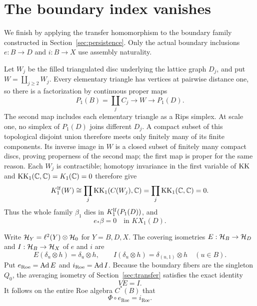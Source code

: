 \section{The boundary index vanishes}\label{sec:vanishing}

We finish by applying the transfer homomorphism to the boundary family
constructed in Section~\ref{sec:persistence}. Only the actual boundary
inclusions $e:B\to D$ and $i:B\to X$ use assembly naturality.

Let $W_j$ be the filled triangulated disc underlying the lattice graph $D_j$,
and put $W=\coprod_{j\ge2}W_j$. Every elementary triangle has vertices at
pairwise distance one, so there is a factorization by continuous proper maps
\[
 P_1(B)=\coprod_j C_j\longrightarrow W\longrightarrow P_1(D).
\]
The second map includes each elementary triangle as a Rips simplex.
At scale one, no simplex of $P_1(D)$ joins different $D_j$.
A compact subset of this topological disjoint union therefore meets only
finitely many of its finite components. Its inverse image in $W$ is a closed
subset of finitely many compact discs, proving properness of the second map;
the first map is proper for the same reason. Each $W_j$ is contractible;
homotopy invariance in the first variable of $\operatorname{KK}$ and
$\operatorname{KK}_1(\mathbb C,\mathbb C)=K_1(\mathbb C)=0$
\cite[Proposition~17.9.1 and Section~19.8.3]{Blackadar} therefore give
\[
 K_1^{\mathrm{lf}}(W)\cong\prod_j\operatorname{KK}_1(C(W_j),\mathbb C)
 =\prod_j\operatorname{KK}_1(\mathbb C,\mathbb C)=0.
\]
Thus the whole family $\beta_1$ dies in $K_1^{\mathrm{lf}}(P_1(D))$, and
\begin{equation}\label{eq:filledzero}
 e_*\beta=0\quad\text{in }KX_1(D).
\end{equation}

Write $\mathcal H_Y=\ell^2(Y)\otimes\mathcal H_0$ for $Y=B,D,X$. The covering isometries
$E:\mathcal H_B\to\mathcal H_D$ and $I:\mathcal H_B\to\mathcal H_X$ of $e$ and $i$ are
\[
 E(\delta_u\otimes h)=\delta_u\otimes h,
 \qquad I(\delta_u\otimes h)=\delta_{(u,1)}\otimes h
 \quad(u\in B).
\]
Put $e_{\mathrm{Roe}}=\operatorname{Ad} E$ and $i_{\mathrm{Roe}}=\operatorname{Ad} I$.
Because the boundary fibers are the
singleton $Q_0$, the averaging isometry of Section~\ref{sec:transfer}
satisfies the exact identity
\[
 VE=I.
\]
It follows on the entire Roe algebra $C^*(B)$ that
\begin{equation}\label{eq:operatorfactor}
 \Phi\circ e_{\mathrm{Roe}}=i_{\mathrm{Roe}}.
\end{equation}

